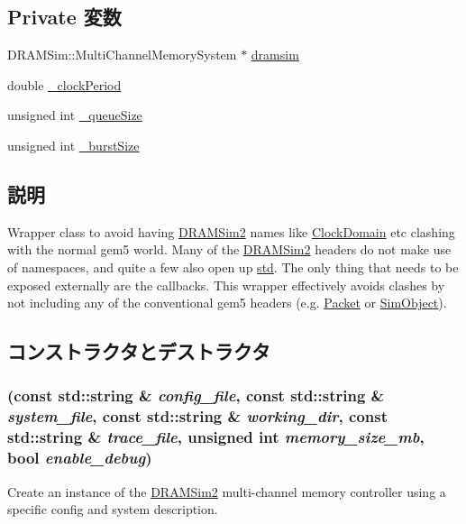 \subsection*{Private 変数}
\begin{DoxyCompactItemize}
\item 
DRAMSim::MultiChannelMemorySystem $\ast$ \hyperlink{classDRAMSim2Wrapper_ab3fdccad236992bb048094aa3fb52893}{dramsim}
\item 
double \hyperlink{classDRAMSim2Wrapper_aba0cb71192619554d50451635e5d6a52}{\_\-clockPeriod}
\item 
unsigned int \hyperlink{classDRAMSim2Wrapper_a16dbba262c462bdaa1a3e55e1d69968c}{\_\-queueSize}
\item 
unsigned int \hyperlink{classDRAMSim2Wrapper_a5164bcd378cd3ca479f3df831726f5da}{\_\-burstSize}
\end{DoxyCompactItemize}


\subsection{説明}
Wrapper class to avoid having \hyperlink{classDRAMSim2}{DRAMSim2} names like \hyperlink{classClockDomain}{ClockDomain} etc clashing with the normal gem5 world. Many of the \hyperlink{classDRAMSim2}{DRAMSim2} headers do not make use of namespaces, and quite a few also open up \hyperlink{namespacestd}{std}. The only thing that needs to be exposed externally are the callbacks. This wrapper effectively avoids clashes by not including any of the conventional gem5 headers (e.g. \hyperlink{classPacket}{Packet} or \hyperlink{classSimObject}{SimObject}). 

\subsection{コンストラクタとデストラクタ}
\hypertarget{classDRAMSim2Wrapper_afb9d47202b904139c97115bb9b11a1f2}{
\subsubsection[{DRAMSim2Wrapper}]{ (const std::string \& {\em config\_\-file}, \/  const std::string \& {\em system\_\-file}, \/  const std::string \& {\em working\_\-dir}, \/  const std::string \& {\em trace\_\-file}, \/  unsigned int {\em memory\_\-size\_\-mb}, \/  bool {\em enable\_\-debug})}}
\label{classDRAMSim2Wrapper_afb9d47202b904139c97115bb9b11a1f2}
Create an instance of the \hyperlink{classDRAMSim2}{DRAMSim2} multi-\/channel memory controller using a specific config and system description.


